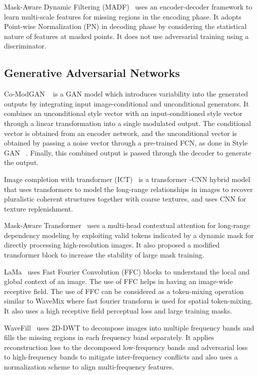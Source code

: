 \documentclass{article}
\begin{document}
Mask-Aware Dynamic Filtering (MADF)~\cite{Zhu_2021} uses an encoder-decoder framework  to learn multi-scale features for missing regions in the encoding phase. It adopts Point-wise Normalization (PN) in decoding phase by considering the statistical nature of features at masked points. It does not use adversarial training using a discriminator.

\subsection{Generative Adversarial Networks}


Co-ModGAN ~\cite{CoMod_GAN2021} is a GAN model  which introduces variability into the generated outputs by integrating input image-conditional and unconditional generators. It combines an unconditional style vector with an input-conditioned style vector through a linear transformation into a single modulated output. The conditional vector is obtained from an encoder network, and the unconditional vector is obtained by passing a noise vector through a pre-trained FCN, as done in Style GAN ~\cite{stylegan2018}. Finally, this combined output is passed through the decoder to generate the output. 

Image completion with transformer (ICT)~\cite{wan2021highfidelity} is a transformer -CNN hybrid model that uses transformers to model the long-range relationships in images to recover pluralistic coherent structures together with coarse textures, and uses CNN for texture replenishment.

Mask-Aware Transformer~\cite{li2022mat} uses a multi-head contextual attention for long-range dependency modeling by exploiting valid tokens indicated by a dynamic mask for directly processing high-resolution images. It also proposed a modified transformer block to increase the stability of large mask training. 

LaMa~\cite{Lama_2021} uses Fast Fourier Convolution (FFC) blocks to understand the local and global context of an image. The use of FFC helps in having an image-wide receptive field. The use of FFC can be considered as a token-mixing operation similar to WaveMix where fast fourier transform is used for spatial token-mixing. It also uses a high receptive field perceptual loss and large training masks. 
 
WaveFill~\cite{yu2021wavefill} uses 2D-DWT to decompose images into multiple frequency bands and fills the missing regions in each frequency band separately. It applies  reconstruction loss to the decomposed low-frequency bands and adversarial loss
to high-frequency bands to mitigate inter-frequency conflicts and also uses a normalization scheme to align multi-frequency features. 
\end{document}
